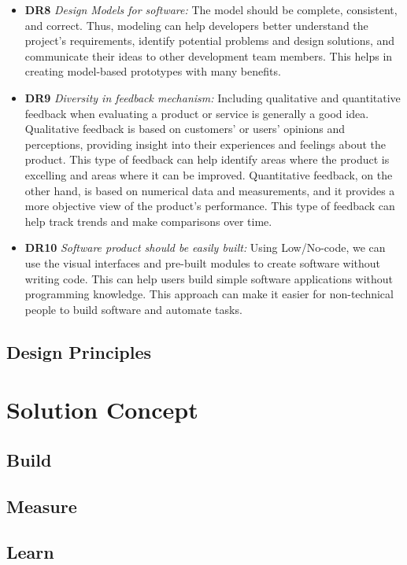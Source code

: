 \begin{itemize}
  \item \textbf{DR8} \textit{Design Models for software:} The model should be complete, consistent, and correct. Thus, modeling can help developers better understand the project's requirements, identify potential problems and design solutions, and communicate their ideas to other development team members. This helps in creating model-based prototypes with many benefits.
  \item \textbf{DR9} \textit{Diversity in feedback mechanism:} Including qualitative and quantitative feedback when evaluating a product or service is generally a good idea. Qualitative feedback is based on customers' or users' opinions and perceptions, providing insight into their experiences and feelings about the product. This type of feedback can help identify areas where the product is excelling and areas where it can be improved. Quantitative feedback, on the other hand, is based on numerical data and measurements, and it provides a more objective view of the product's performance. This type of feedback can help track trends and make comparisons over time.
  \item \textbf{DR10} \textit{Software product should be easily built:} Using Low/No-code, we can use the visual interfaces and pre-built modules to create software without writing code. This can help users build simple software applications without programming knowledge. This approach can make it easier for non-technical people to build software and automate tasks.
\end{itemize}

\subsection{Design Principles}

\section{Solution Concept}

\subsection{Build}

\subsection{Measure}

\subsection{Learn}
